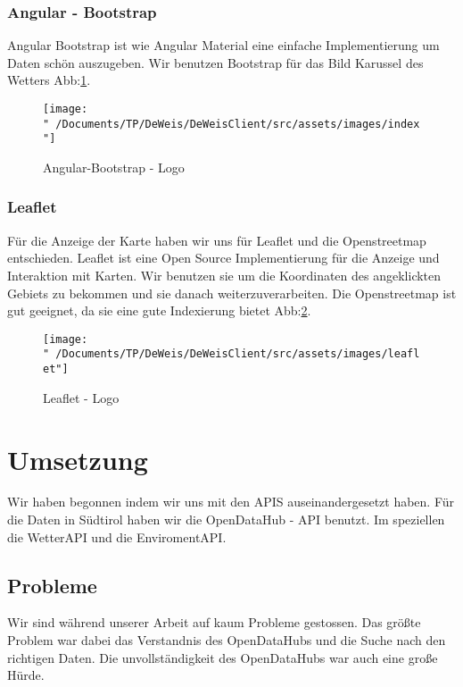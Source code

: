 \documentclass{scrartcl}
\begin{document}
    \subsubsection{Angular - Bootstrap}

    Angular Bootstrap ist wie Angular Material eine einfache Implementierung um Daten schön auszugeben. Wir benutzen Bootstrap 
    für das Bild Karussel des Wetters Abb:\ref{fig:boot}.
    \begin{figure}
    \centering
    \texttt{[image: "~/Documents/TP/DeWeis/DeWeisClient/src/assets/images/index"]}
    \caption{Angular-Bootstrap - Logo}
    \label{fig:boot}
    \end{figure}

    \subsubsection{Leaflet}

    Für die Anzeige der Karte haben wir uns für Leaflet und die Openstreetmap entschieden.
    Leaflet ist eine Open Source Implementierung für die Anzeige und Interaktion mit Karten.
    Wir benutzen sie um die Koordinaten des angeklickten Gebiets zu bekommen und sie danach weiterzuverarbeiten.
    Die Openstreetmap ist gut geeignet, da sie eine gute Indexierung bietet Abb:\ref{fig:leaf}.
    \begin{figure}
    \centering
    \texttt{[image: "~/Documents/TP/DeWeis/DeWeisClient/src/assets/images/leaflet"]}
    \caption{Leaflet - Logo}
    \label{fig:leaf}
    \end{figure}

    \section{Umsetzung}

    Wir haben begonnen indem wir uns mit den APIS auseinandergesetzt haben. Für die Daten in Südtirol haben wir die OpenDataHub - API 
    benutzt. Im speziellen die WetterAPI und die EnviromentAPI.

    \subsection{Probleme}

    Wir sind während unserer Arbeit auf kaum Probleme gestossen. Das größte Problem war dabei das Verstandnis des OpenDataHubs und 
    die Suche nach den richtigen Daten. Die unvollständigkeit des OpenDataHubs war auch eine große Hürde.
\end{document}
